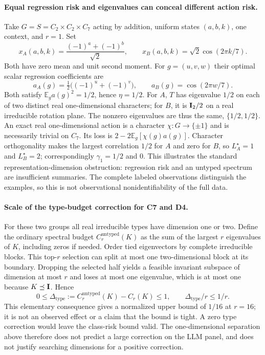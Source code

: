 \paragraph{Equal regression risk and eigenvalues can conceal different action risk.}
\label{sp:counterexample}
Take $G=S=C_2\times C_2\times C_7$ acting by addition, uniform states $(a,b,k)$, one context, and $r=1$. Set
\[
 x_A(a,b,k)=\frac{(-1)^a+(-1)^b}{\sqrt2},\qquad
 x_B(a,b,k)=\sqrt2\cos(2\pi k/7).
\]
Both have zero mean and unit second moment. For $g=(u,v,w)$ their optimal scalar regression coefficients are
\[
 a_A(g)=\tfrac12\big((-1)^u+(-1)^v\big),\qquad
 a_B(g)=\cos(2\pi w/7).
\]
Both satisfy $\mathbb E_g a(g)^2=1/2$, hence $\eta=1/2$. For $A$, $T$ has eigenvalue $1/2$ on each of two distinct real one-dimensional characters; for $B$, it is $\mathbf{I}_2/2$ on a real irreducible rotation plane. The nonzero eigenvalues are thus the same, $\{1/2,1/2\}$. An exact real one-dimensional action is a character $\chi:G\to\{\pm1\}$ and is necessarily trivial on $C_7$. Its loss is $2-2\mathbb E_g[\chi(g)a(g)]$. Character orthogonality makes the largest correlation $1/2$ for $A$ and zero for $B$, so $L_A^\star=1$ and $L_B^\star=2$; correspondingly $\gamma_1=1/2$ and $0$. This illustrates the standard representation-dimension obstruction: regression risk and an untyped spectrum are insufficient summaries. The complete labeled observations distinguish the examples, so this is not observational nonidentifiability of the full data.

\paragraph{Scale of the type-budget correction for C7 and D4.}
\label{sp:type-scale}
For these two groups all real irreducible types have dimension one or two. Define the ordinary spectral budget $C_r^{\mathrm{untyped}}(K)$ as the sum of the largest $r$ eigenvalues of $K$, including zeros if needed. Order tied eigenvectors by complete irreducible blocks. This top-$r$ selection can split at most one two-dimensional block at its boundary. Dropping the selected half yields a feasible invariant subspace of dimension at most $r$ and loses at most one eigenvalue, which is at most one because $K\preceq\mathbf{I}$. Hence
\[
 0\le \Delta_{\mathrm{type}}
 :=C_r^{\mathrm{untyped}}(K)-C_r(K)\le1,
 \qquad \Delta_{\mathrm{type}}/r\le1/r.
\]
This elementary consequence gives a normalized upper bound of $1/16$ at $r=16$; it is not an observed effect or a claim that the bound is tight. A zero type correction would leave the class-risk bound valid. The one-dimensional separation above therefore does not predict a large correction on the LLM panel, and does not justify searching dimensions for a positive correction.

